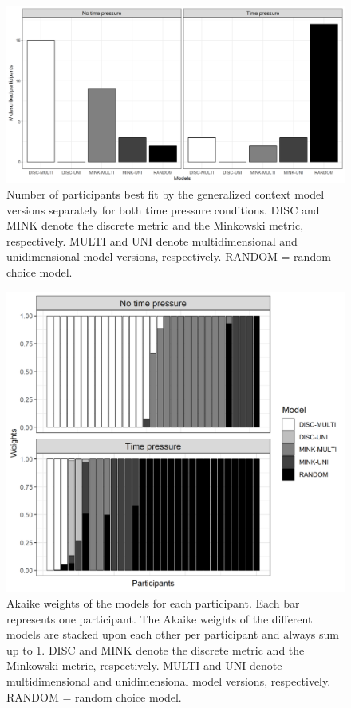 \documentclass[a4paper,man,natbib]{apa6}
\begin{document}
\begin{figure}
\centering
\includegraphics[width = \textwidth]{fig_model_selection.png}
\caption{Number of participants best fit by the generalized context model versions separately for both time pressure conditions. DISC and MINK denote the discrete metric and the Minkowski metric, respectively. MULTI and UNI denote multidimensional and unidimensional model versions, respectively. RANDOM = random choice model.}
\label{fig:model_selection}
\end{figure}

\begin{figure}
\centering
\includegraphics[width = \textwidth]{fig_aic.png}
\caption{Akaike weights of the models for each participant. Each bar represents one participant. The Akaike weights of the different models are stacked upon each other per participant and always sum up to 1. DISC and MINK denote the discrete metric and the Minkowski metric, respectively. MULTI and UNI denote multidimensional and unidimensional model versions, respectively. RANDOM = random choice model.}
\label{fig:aic}
\end{figure}
\end{document}
